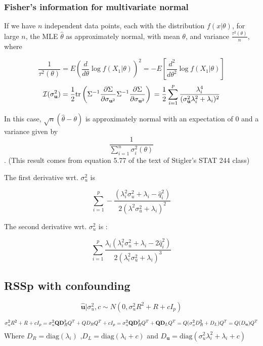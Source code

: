 
\subsubsection{Fisher's information for multivariate normal}\label{sec:orgc6a5fb9}

If we have \(n\) independent data points, each with the distribution \(f(x|\theta)\), for large \(n\), the MLE \(\hat{\theta}\) as approximately normal, with mean \(\theta\), and variance \(\frac{\tau^2(\theta)}{n}\), where 

$$ \frac{1}{\tau^2(\theta)}=E \left( \frac{d}{d \theta} \log f(X_1|\theta) \right)^2 = -E \left[ \frac{d^2}{d\theta^2} \log f(X_1|\theta) \right]$$
$$\mathcal{I}(\sigma_\textbf{u}^2)=\frac{1}{2}\text{tr}\left( \Sigma^{-1} \frac{\partial  \Sigma}{\partial \sigma_{\textbf{u}^2}}  \Sigma^{-1} \frac{\partial  \Sigma}{\partial \sigma_{\textbf{u}^2}} \right) \\ 
=\frac{1}{2}\sum_{i=1}^p \frac{\lambda_i^4}{(\sigma_\textbf{u}^2 \lambda_i^2+\lambda_i)^2} $$

In this case, \(\sqrt{n}(\hat{\theta}-\theta)\) is approximately normal with an expectation of \(0\)  and a variance given by $$\frac{1}{\sum_{i=1}^n \sigma_i^2(\theta)}$$.  (This result comes from equation 5.77 of the text of Stigler's STAT 244 class)


The first derivative wrt. \(\sigma_u^2\) is

$$\sum_{i=1}^p -\frac{(\lambda_i^2 \sigma_u^2 + \lambda_i - \hat{q}_i^2)}{2 (\lambda^2 \sigma_u^2 + \lambda_i)^2}$$

The second derivative wrt. \(\sigma_u^2\) is :

$$\sum_{i=1}^p  \frac{\lambda_i (\lambda_i^2 \sigma_u^2 + \lambda_i - 2 \hat{q}_i^2)}{2 (\lambda_i^2 \sigma_u^2 + \lambda_i)^3}$$

\subsection{RSSp with confounding}\label{sec:org33ff459}


$$ \hat{\textbf{u}}|\sigma_u^2,c \sim N(0,\sigma_u^2R^2+R+cI_p)$$

$$\sigma^2_uR^2+R+cI_p \\ = \sigma_u^2\textbf{Q}\textbf{D}_R^2Q^{T} + Q D_{R} Q^{T} + cI_p \\ =\sigma_u^2\textbf{Q}\textbf{D}_R^2Q^{T}+\textbf{Q}\textbf{D}_LQ^{T} \\ =Q(\sigma_u^2D^2_R + D_L)Q^{T} \\ =Q(D_\textbf{u})Q^{T}$$
Where \(D_R=\text{diag}\left(\lambda_i\right)\) ,\(D_L=\text{diag}\left(\lambda_i+c\right)\) and \(D_\textbf{u}=\text{diag}\left(\sigma_u^2\lambda_i^2+\lambda_i+c\right)\)

